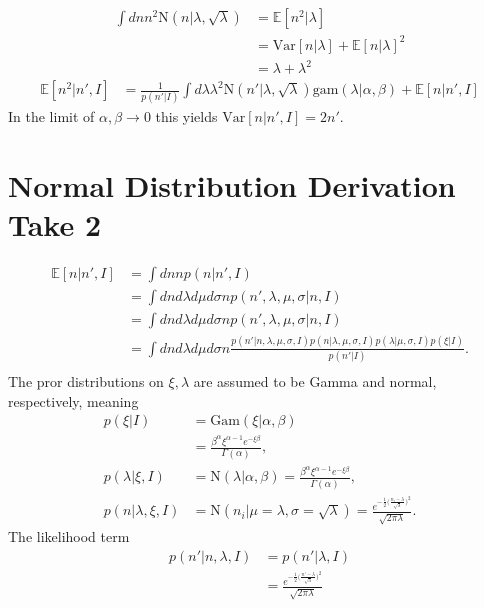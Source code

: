 \begin{equation}
	\begin{split}
		\int dn n^2 \text{N}(n|\lambda, \sqrt{\lambda})  & =\mathbb{E}[n^2|\lambda]\\
		& = \text{Var}[n|\lambda]+\mathbb{E}[n|\lambda]^2\\
		&= \lambda+\lambda^2
	\end{split}
\end{equation}
\begin{equation}
	\begin{split}
		\mathbb{E}[n^2|n',I] & = \frac{1}{p(n'|I)}\int d\lambda  \lambda^2 \text{N}(n'| \lambda,\sqrt{\lambda})\text{gam}(\lambda|\alpha,\beta)+\mathbb{E}[n|n',I]
	\end{split}
\end{equation}
In the limit of $\alpha,\beta \rightarrow 0$ this yields $\text{Var}[n|n',I]=2n'$.



\section{Normal Distribution Derivation Take 2}
\begin{equation}
	\begin{split}
		\mathbb{E}[n|n',I] &= \int dn np(n|n',I)\\
		& = \int dnd\lambda d\mu d\sigma n p(n',\lambda,\mu,\sigma|n,I)\\
		& = \int dnd\lambda d\mu d\sigma n p(n',\lambda,\mu,\sigma|n,I)\\
		& = \int dnd\lambda d\mu d\sigma n  \frac{p(n'|n,\lambda,\mu,\sigma,I)p(n|\lambda,\mu,\sigma,I)p(\lambda|\mu,\sigma,I)p(\xi|I)}{p(n'|I)}.\\
	\end{split}
\end{equation}
The pror distributions on $\xi,\lambda$ are assumed to be Gamma and normal, respectively, meaning
\begin{equation}
	\begin{split}
		p(\xi|I) &= \text{Gam}(\xi|\alpha,\beta)\\
		&=\frac{\beta^\alpha\xi^{\alpha-1}e^{-\xi \beta}}{\Gamma(\alpha)},\\
		p(\lambda|\xi,I) &= \text{N}(\lambda|\alpha,\beta)=\frac{\beta^\alpha\xi^{\alpha-1}e^{-\xi \beta}}{\Gamma(\alpha)},\\
		p(n|\lambda,\xi,I) &= \text{N}(n_i|\mu = \lambda,\sigma = \sqrt{\lambda})= \frac{e^{-\frac{1}{2}\big(\frac{n_i-\lambda}{\sqrt{\lambda}}\big)^2}}{\sqrt{2\pi\lambda}}.
	\end{split}
\end{equation}
The likelihood term
\begin{equation}
	\begin{split}
		p(n'|n,\lambda,I) & = p(n'|\lambda,I)\\
		& =\frac{e^{-\frac{1}{2}\big(\frac{n'-\lambda}{\sqrt{\lambda}}\big)^2}}{\sqrt{2\pi\lambda}}
	\end{split}
\end{equation}

